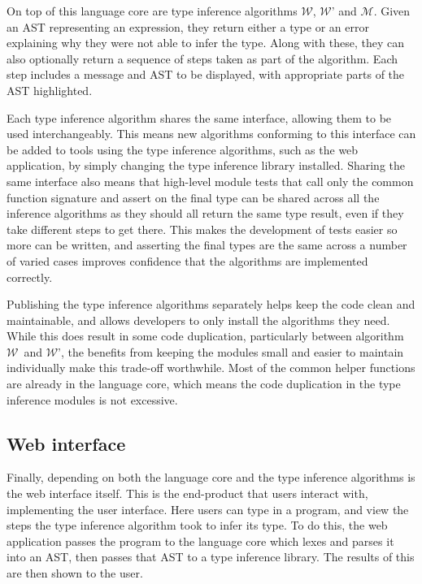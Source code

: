 \documentclass[a4paper,fleqn,oneside,12pt]{report}
\newcommand{\W}{$\mathcal{W}$}
\newcommand{\M}{$\mathcal{M}$}
\begin{document}
On top of this language core are type inference algorithms \W, \W' and \M. Given an AST representing an expression, they return either a type or an error explaining why they were not able to infer the type. Along with these, they can also optionally return a sequence of steps taken as part of the algorithm. Each step includes a message and AST to be displayed, with appropriate parts of the AST highlighted.

Each type inference algorithm shares the same interface, allowing them to be used interchangeably. This means new algorithms conforming to this interface can be added to tools using the type inference algorithms, such as the web application, by simply changing the type inference library installed. Sharing the same interface also means that high-level module tests that call only the common function signature and assert on the final type can be shared across all the inference algorithms as they should all return the same type result, even if they take different steps to get there. This makes the development of tests easier so more can be written, and asserting the final types are the same across a number of varied cases improves confidence that the algorithms are implemented correctly.

Publishing the type inference algorithms separately helps keep the code clean and maintainable, and allows developers to only install the algorithms they need. While this does result in some code duplication, particularly between algorithm \W\ and \W', the benefits from keeping the modules small and easier to maintain individually make this trade-off worthwhile. Most of the common helper functions are already in the language core, which means the code duplication in the type inference modules is not excessive.

\subsection{Web interface}\label{id:h.q67ivlz7h61r}

Finally, depending on both the language core and the type inference algorithms is the web interface itself. This is the end-product that users interact with, implementing the user interface. Here users can type in a program, and view the steps the type inference algorithm took to infer its type. To do this, the web application passes the program to the language core which lexes and parses it into an AST, then passes that AST to a type inference library. The results of this are then shown to the user.
\end{document}
